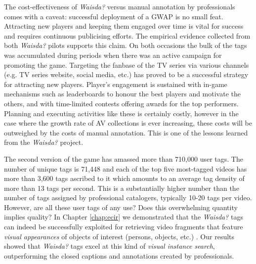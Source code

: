 The cost-effectiveness of \textit{Waisda?} versus manual annotation by professionals comes with a caveat: successful deployment of a GWAP is no small feat. Attracting new players and keeping them engaged over time is vital for success and requires continuous publicising efforts. The empirical evidence collected from both \textit{Waisda?} pilots supports this claim. On both occasions the bulk of the tags was accumulated during periods when there was an active campaign for promoting the game. Targeting the fanbase of the TV series via various channels (e.g. TV series website, social media, etc.) has proved to be a successful strategy for attracting new players. Player's engagement is sustained with in-game mechanisms such as leaderboards to honour the best players and motivate the others, and with time-limited contests offering awards for the top performers. Planning and executing activities like these is certainly costly, however in the case where the growth rate of AV collections is ever increasing, these costs will be outweighed by the costs of manual annotation. This is one of the lessons learned from the \textit{Waisda?} project.


The second version of the game has amassed more than 710,000 user tags. The number of unique tags is 71,448 and each of the top five most-tagged videos has more than 3,600 tags ascribed to it which amounts to an average tag density of more than 13 tags per second. This is a substantially higher number than the number of tags assigned by professional catalogers, typically 10-20 tags per video. However, are all these user tags of any use? Does this overwhelming quantity implies quality? In Chapter \ref{chap:ecir} we demonstrated that the \textit{Waisda?} tags can indeed be successfully exploited for retrieving video fragments that feature \textit{visual appearances} of objects of interest (persons, objects, etc.) \cite{ecir}. Our results showed that \textit{Waisda?} tags excel at this kind of \textit{visual instance search}, outperforming the closed captions and annotations created by professionals. 

